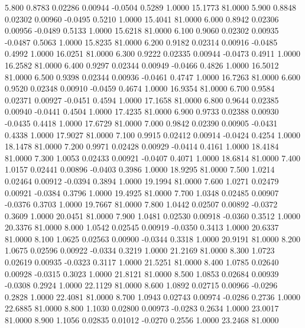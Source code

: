    5.800   0.8783   0.02286   0.00944  -0.0504   0.5289   1.0000  15.1773  81.0000
   5.900   0.8848   0.02302   0.00960  -0.0495   0.5210   1.0000  15.4041  81.0000
   6.000   0.8942   0.02306   0.00956  -0.0489   0.5133   1.0000  15.6218  81.0000
   6.100   0.9060   0.02302   0.00935  -0.0487   0.5063   1.0000  15.8235  81.0000
   6.200   0.9182   0.02314   0.00916  -0.0485   0.4992   1.0000  16.0251  81.0000
   6.300   0.9222   0.02335   0.00944  -0.0473   0.4911   1.0000  16.2582  81.0000
   6.400   0.9297   0.02344   0.00949  -0.0466   0.4826   1.0000  16.5012  81.0000
   6.500   0.9398   0.02344   0.00936  -0.0461   0.4747   1.0000  16.7263  81.0000
   6.600   0.9520   0.02348   0.00910  -0.0459   0.4674   1.0000  16.9354  81.0000
   6.700   0.9584   0.02371   0.00927  -0.0451   0.4594   1.0000  17.1658  81.0000
   6.800   0.9644   0.02385   0.00940  -0.0441   0.4504   1.0000  17.4235  81.0000
   6.900   0.9733   0.02388   0.00930  -0.0435   0.4418   1.0000  17.6729  81.0000
   7.000   0.9842   0.02390   0.00905  -0.0431   0.4338   1.0000  17.9027  81.0000
   7.100   0.9915   0.02412   0.00914  -0.0424   0.4254   1.0000  18.1478  81.0000
   7.200   0.9971   0.02428   0.00929  -0.0414   0.4161   1.0000  18.4184  81.0000
   7.300   1.0053   0.02433   0.00921  -0.0407   0.4071   1.0000  18.6814  81.0000
   7.400   1.0157   0.02441   0.00896  -0.0403   0.3986   1.0000  18.9295  81.0000
   7.500   1.0214   0.02464   0.00912  -0.0394   0.3894   1.0000  19.1994  81.0000
   7.600   1.0271   0.02479   0.00921  -0.0384   0.3796   1.0000  19.4925  81.0000
   7.700   1.0348   0.02485   0.00907  -0.0376   0.3703   1.0000  19.7667  81.0000
   7.800   1.0442   0.02507   0.00892  -0.0372   0.3609   1.0000  20.0451  81.0000
   7.900   1.0481   0.02530   0.00918  -0.0360   0.3512   1.0000  20.3376  81.0000
   8.000   1.0542   0.02545   0.00919  -0.0350   0.3413   1.0000  20.6337  81.0000
   8.100   1.0625   0.02563   0.00900  -0.0344   0.3318   1.0000  20.9191  81.0000
   8.200   1.0675   0.02596   0.00922  -0.0334   0.3219   1.0000  21.2169  81.0000
   8.300   1.0723   0.02619   0.00935  -0.0323   0.3117   1.0000  21.5251  81.0000
   8.400   1.0785   0.02640   0.00928  -0.0315   0.3023   1.0000  21.8121  81.0000
   8.500   1.0853   0.02684   0.00939  -0.0308   0.2924   1.0000  22.1129  81.0000
   8.600   1.0892   0.02715   0.00966  -0.0296   0.2828   1.0000  22.4081  81.0000
   8.700   1.0943   0.02743   0.00974  -0.0286   0.2736   1.0000  22.6885  81.0000
   8.800   1.1030   0.02800   0.00973  -0.0283   0.2634   1.0000  23.0017  81.0000
   8.900   1.1056   0.02835   0.01012  -0.0270   0.2556   1.0000  23.2468  81.0000
